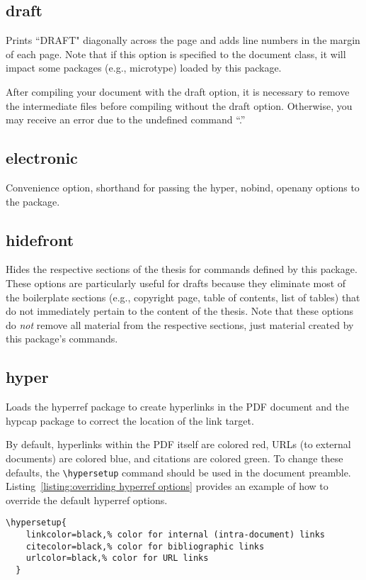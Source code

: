 \documentclass[10pt]{article}
\newcommand{\package}[1]{#1}
\newcommand{\option}[1]{#1}
\newcommand{\command}[1]{\texttt{\textbackslash#1}}
\begin{document}
\subsection{\option{draft}}
Prints ``DRAFT" diagonally across the page and adds line numbers in the margin of each page.
Note that if this option is specified to the document class, it will impact some packages (e.g., \package{microtype}) loaded by this package.

After compiling your document with the draft option, it is necessary to remove the intermediate files before compiling without the draft option.
Otherwise, you may receive an error due to the undefined command ``\textbackslash@LN.''

\subsection{\option{electronic}}
Convenience option, shorthand for passing the \option{hyper}, \option{nobind}, \option{openany} options to the package.

\subsection{\option{hidefront}}
Hides the respective sections of the thesis for commands defined by this package.
These options are particularly useful for drafts because they eliminate most of the boilerplate sections (e.g., copyright page, table of contents, list of tables) that do not immediately pertain to the content of the thesis.
Note that these options do \emph{not} remove all material from the respective sections, just material created by this package's commands.

\subsection{\option{hyper}}
Loads the \package{hyperref} package to create hyperlinks in the PDF document and the \package{hypcap} package to correct the location of the link target.

By default, hyperlinks within the PDF itself are colored red, URLs (to external documents) are colored blue, and citations are colored green.
To change these defaults, the \command{hypersetup} command should be used in the document preamble.
Listing~\ref{listing:overriding hyperref options} provides an example of how to override the default \package{hyperref} options.

\begin{lstlisting}[gobble=2,float=h,caption={
    An example of overriding the default \package{hyperref} options.
    All links will be colored black by default.
  },label={listing:overriding hyperref options}]
  \hypersetup{
    linkcolor=black,% color for internal (intra-document) links
    citecolor=black,% color for bibliographic links
    urlcolor=black,% color for URL links
  }
\end{lstlisting}
\end{document}
